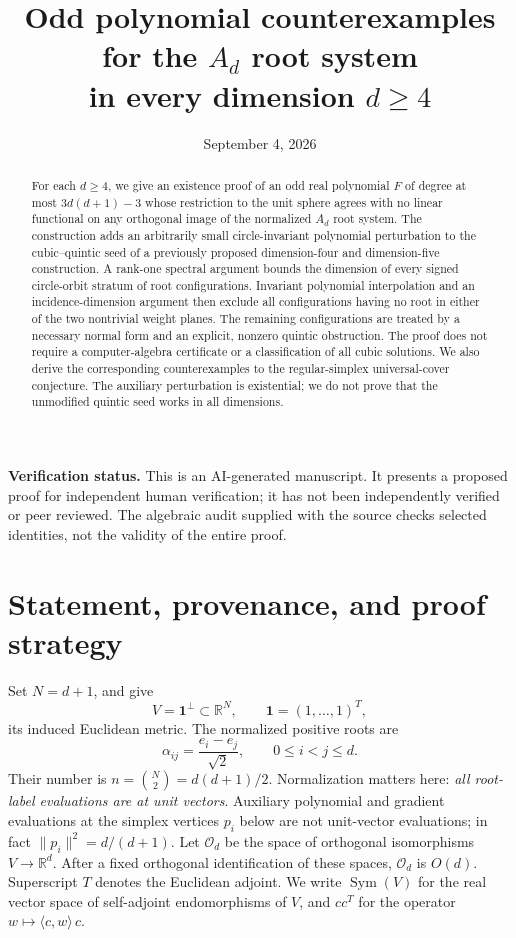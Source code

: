 \documentclass[11pt,reqno]{amsart}
\title[Odd polynomial counterexamples for the $A_d$ root system]
{Odd polynomial counterexamples for the $A_d$ root system\\
in every dimension $d\geq4$}
\author{}
\date{September 4, 2026}
\theoremstyle{definition}
\theoremstyle{remark}
\numberwithin{equation}{section}
\newcommand{\R}{\mathbb R}
\newcommand{\one}{\mathbf 1}
\newcommand{\Orth}{\mathcal O_d}
\newcommand{\ip}[2]{\langle #1,#2\rangle}
\newcommand{\norm}[1]{\lVert #1\rVert}
\DeclareMathOperator{\Sym}{Sym}
\begin{document}
\begin{abstract}
For each $d\geq4$, we give an existence proof of an odd real polynomial
$F$ of degree at most $3d(d+1)-3$ whose restriction to the unit sphere
agrees with no linear functional on any orthogonal image of the normalized
$A_d$ root system. The construction adds an arbitrarily small
circle-invariant polynomial perturbation to the cubic--quintic seed of a
previously proposed dimension-four and dimension-five construction. A rank-one
spectral argument bounds the dimension of every signed circle-orbit
stratum of root configurations. Invariant polynomial interpolation and an
incidence-dimension argument then exclude all configurations having no
root in either of the two nontrivial weight planes. The remaining
configurations are treated by a necessary normal form and an explicit,
nonzero quintic obstruction. The proof does not require a
computer-algebra certificate or a classification of all cubic solutions.
We also derive the corresponding counterexamples to the regular-simplex
universal-cover conjecture. The auxiliary perturbation is existential;
we do not prove that the unmodified quintic seed works in all dimensions.
\end{abstract}
\maketitle

\noindent\textbf{Verification status.}
This is an AI-generated manuscript. It presents a proposed proof
for independent human verification; it has not been independently verified
or peer reviewed. The algebraic audit supplied with the source checks
selected identities, not the validity of the entire proof.

\tableofcontents
\clearpage

\section{Statement, provenance, and proof strategy}\label{sec:introduction}

Set $N=d+1$, and give
\[
 V=\one^\perp\subset\R^N,\qquad \one=(1,\ldots,1)^T,
\]
its induced Euclidean metric. The normalized positive roots are
\begin{equation}\label{eq:roots}
 \alpha_{ij}=\frac{e_i-e_j}{\sqrt2},\qquad 0\leq i<j\leq d.
\end{equation}
Their number is $n=\binom N2=d(d+1)/2$. Normalization matters here:
\emph{all root-label evaluations are at unit vectors}. Auxiliary polynomial
and gradient evaluations at the simplex vertices $p_i$ below are not unit-vector
evaluations; in fact $\norm{p_i}^2=d/(d+1)$.
Let $\Orth$ be the space of orthogonal isomorphisms $V\to\R^d$.
After a fixed orthogonal identification of these spaces, $\Orth$ is
$O(d)$. Superscript $T$ denotes the Euclidean adjoint. We write
$\Sym(V)$ for the real vector space of self-adjoint endomorphisms of $V$,
and $cc^T$ for the operator $w\mapsto\ip c w\,c$.
\end{document}
